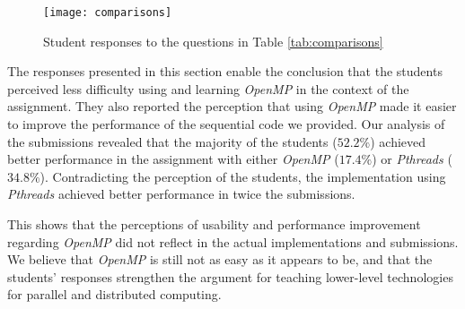 \begin{figure}[htpb]
    \centering
    \texttt{[image: comparisons]}
    \caption{Student responses to the questions in Table \ref{tab:comparisons}}
    \label{fig:comparisons}
\end{figure}


The responses presented in this section enable the conclusion that the students
perceived less difficulty using and learning \textit{OpenMP} in the context
of the assignment. They also reported the perception that using \textit{OpenMP}
made it easier to improve the performance of the sequential code we provided.
Our analysis of the submissions revealed that the majority of the students
($52.2\%$) achieved better performance in the assignment with either
\textit{OpenMP} ($17.4\%$) or \textit{Pthreads} ($34.8\%$). Contradicting the
perception of the students, the implementation using \textit{Pthreads} achieved
better performance in twice the submissions.

This shows that the perceptions of usability and performance improvement
regarding \textit{OpenMP} did not reflect in the actual implementations and
submissions. We believe that \textit{OpenMP} is still not as easy as it appears
to be, and that the students' responses strengthen the argument for teaching
lower-level technologies for parallel and distributed computing.
